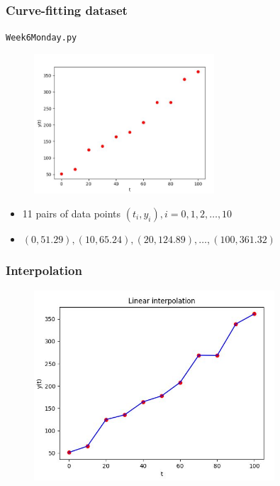 \documentclass[english,14pt]{beamer}
\begin{document}
\begin{frame}[fragile]

\frametitle{Curve-fitting dataset}

\texttt{Week6Monday.py}
\vspace*{-3mm}
\begin{figure}[ht]
	\centering
	\includegraphics[width=0.6\textwidth]{figures/Week6MonDataset}
\end{figure}
\vspace*{-5mm}
\begin{itemize}
	\item 11 pairs of data points $(t_i,y_i), i = 0,1,2,\ldots,10$
	\item[] {\small $(0,51.29), (10,65.24), (20,124.89), \ldots,(100,361.32)$}
\end{itemize}

\end{frame}


\begin{frame}[fragile]

\frametitle{Interpolation}

\vspace*{-3mm}
\begin{figure}[ht]
	\centering
	\includegraphics[width=0.8\textwidth]{figures/Week6MonLinearInterp}
\end{figure}

\end{frame}
\end{document}
